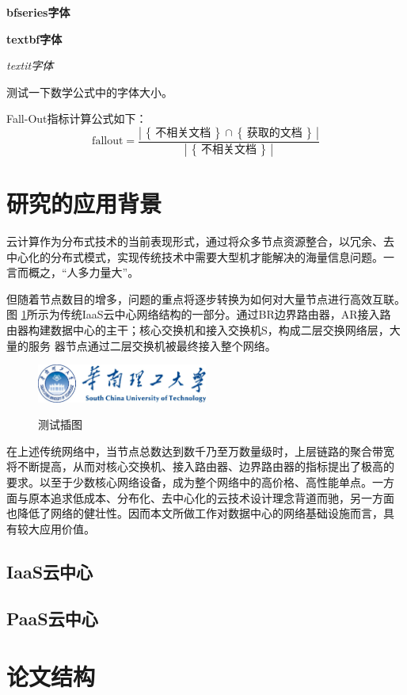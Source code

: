 \documentclass[phd,nobackinfo]{scutthesis}
\begin{document}
{\bfseries bfseries字体}

{\textbf{textbf字体}}

{\textit{textit字体}}

测试一下数学公式中的字体大小。

\newcommand{\set}[1]{\left\{\,#1\,\right\}}
\newcommand{\card}[1]{\left|\,#1\,\right|}

Fall-Out指标计算公式如下：
\begin{equation*}
  \mbox{fallout} = \frac{\card{\set{\text{不相关文档}}\cap\set{\text{获取的文档}}}}{\card{\set{\text{不相关文档}}}}
\end{equation*}

\section{研究的应用背景}
云计算作为分布式技术的当前表现形式，通过将众多节点资源整合，以冗余、去
中心化的分布式模式，实现传统技术中需要大型机才能解决的海量信息问题。一
言而概之，“人多力量大”。

但随着节点数目的增多，问题的重点将逐步转换为如何对大量节点进行高效互联。图
\ref{fig:test1}所示为传统IaaS云中心网络结构的一部分。通过BR边界路由器，AR接入路
由器构建数据中心的主干；核心交换机和接入交换机S，构成二层交换网络层，大量的服务
器节点通过二层交换机被最终接入整个网络。
\begin{figure}[htbp]
  \centering
  \includegraphics[width= 0.5\textwidth]{scutlogo.eps}\\
  \caption{测试插图}\label{fig:test1}
\end{figure}
在上述传统网络中，当节点总数达到数千乃至万数量级时，上层链路的聚合带宽
将不断提高，从而对核心交换机、接入路由器、边界路由器的指标提出了极高的
要求。以至于少数核心网络设备，成为整个网络中的高价格、高性能单点。一方
面与原本追求低成本、分布化、去中心化的云技术设计理念背道而驰，另一方面
也降低了网络的健壮性。因而本文所做工作对数据中心的网络基础设施而言，具
有较大应用价值。
\subsection{IaaS云中心}
\Blindtext
\subsection{PaaS云中心}
\Blindtext
\section{论文结构}
\Blindtext
\end{document}
